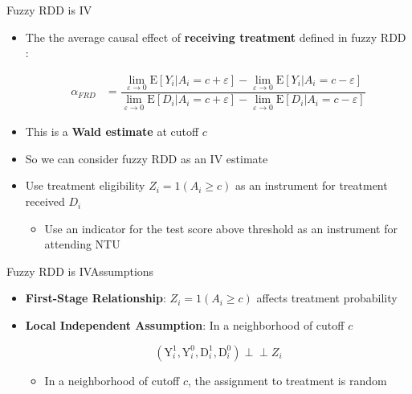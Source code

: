\documentclass[dvipsnames,hyperref={pdfpagelabels=false}]{beamer}
\newcommand{\indep}{\perp\!\!\!\perp}
\begin{document}
\begin{frame}{Fuzzy RDD is IV}{}
	\begin{itemize}
		
		\item The the average causal effect of \textbf{receiving treatment} defined in fuzzy RDD :
		
		\begin{equation*}
			\begin{aligned}
				\alpha_{FRD} &=\dfrac{\lim_{\varepsilon\rightarrow 0}\mathrm{E}[Y_{i}|A_{i}=c+\varepsilon]-\lim_{\varepsilon\rightarrow 0}\mathrm{E}[Y_{i}|A_{i}=c-\varepsilon]}{	\lim_{\varepsilon\rightarrow 0}\mathrm{E}[D_{i}|A_{i}=c+\varepsilon]-\lim_{\varepsilon\rightarrow 0}\mathrm{E}[D_{i}|A_{i}=c-\varepsilon]} 
			\end{aligned}
		\end{equation*} 
		
		
		\item This is a \textbf{Wald estimate} at cutoff $c$
		\vspace{0.2cm}
		\item So we can consider fuzzy RDD as an IV estimate
		\vspace{0.2cm}
		\item Use treatment eligibility $Z_{i}=1(A_i\geq c)$ as an instrument for treatment received $D_{i}$
		\vspace{0.2cm}
		\begin{itemize}
			\item Use an indicator for the test score above threshold as an instrument for attending NTU
		\end{itemize}	
	\end{itemize}
\end{frame}





\begin{frame}{Fuzzy RDD is IV}{Assumptions}
	\begin{itemize}
		
		\item \textbf{First-Stage Relationship}: $Z_{i}=1(A_i\geq c)$ affects treatment probability
		
		\vspace{0.2cm}
		\item \textbf{Local Independent Assumption}: In a neighborhood of cutoff $c$
		
		\begin{equation*}
			(\mathrm{Y}^{1}_{i},\mathrm{Y}^{0}_{i}, \mathrm{D}^{1}_{i},\mathrm{D}^{0}_{i})\indep Z_{i}
		\end{equation*}
		\vspace{0.2cm}
		\begin{itemize}
			\item In a neighborhood of cutoff $c$, the assignment to treatment is random		
		\end{itemize}		
		
	\end{itemize}
\end{frame}
\end{document}
